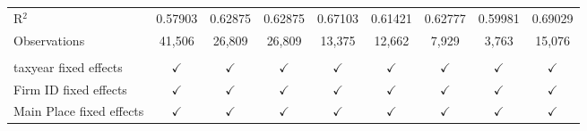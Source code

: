 \begin{tabular}{lcccccccc}
    \\
   R$^2$                                   & 0.57903       & 0.62875        & 0.62875        & 0.67103       & 0.61421        & 0.62777       & 0.59981       & 0.69029\\  
   Observations                            & 41,506        & 26,809         & 26,809         & 13,375        & 12,662         & 7,929         & 3,763         & 15,076\\  
    \\
   taxyear fixed effects                   & $\checkmark$  & $\checkmark$   & $\checkmark$   & $\checkmark$  & $\checkmark$   & $\checkmark$  & $\checkmark$  & $\checkmark$\\   
   Firm ID fixed effects                   & $\checkmark$  & $\checkmark$   & $\checkmark$   & $\checkmark$  & $\checkmark$   & $\checkmark$  & $\checkmark$  & $\checkmark$\\   
   Main Place fixed effects                & $\checkmark$  & $\checkmark$   & $\checkmark$   & $\checkmark$  & $\checkmark$   & $\checkmark$  & $\checkmark$  & $\checkmark$\\   
   \bottomrule
\end{tabular}
\par\endgroup
